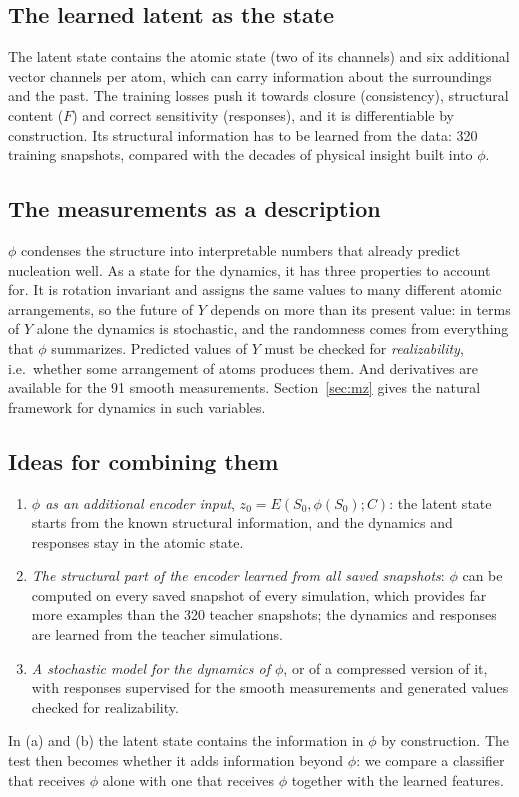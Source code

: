 \documentclass[11pt,a4paper]{article}
\numberwithin{equation}{section}
\begin{document}
\subsection{The learned latent as the state}

The latent state contains the atomic state (two of its channels) and six additional
vector channels per atom, which can carry information about the surroundings and
the past. The training losses push it towards closure (consistency), structural
content ($F$) and correct sensitivity (responses), and it is differentiable by
construction. Its structural information has to be learned from the data: 320
training snapshots, compared with the decades of physical insight built into $\phi$.

\subsection{The measurements as a description}

$\phi$ condenses the structure into interpretable numbers that already predict
nucleation well. As a state for the dynamics, it has three properties to account
for. It is rotation invariant and assigns the same values to many different atomic
arrangements, so the future of $Y$ depends on more than its present value: in terms
of $Y$ alone the dynamics is stochastic, and the randomness comes from everything
that $\phi$ summarizes. Predicted values of $Y$ must be checked for
\emph{realizability}, i.e.\ whether some arrangement of atoms produces them. And
derivatives are available for the 91 smooth measurements. Section~\ref{sec:mz}
gives the natural framework for dynamics in such variables.

\subsection{Ideas for combining them}
\label{sec:ideas}

\begin{enumerate}[label=(\alph*),leftmargin=2em]
\item \emph{$\phi$ as an additional encoder input}, $z_0=E(S_0,\phi(S_0);C)$: the latent state
  starts from the known structural information, and the dynamics and responses stay in the
  atomic state.
\item \emph{The structural part of the encoder learned from all saved snapshots}: $\phi$ can be
  computed on every saved snapshot of every simulation, which provides far more examples than
  the 320 teacher snapshots; the dynamics and responses are learned from the teacher
  simulations.
\item \emph{A stochastic model for the dynamics of $\phi$}, or of a compressed version of it, with
  responses supervised for the smooth measurements and generated values checked for
  realizability.
\end{enumerate}
In (a) and (b) the latent state contains the information in $\phi$ by
construction. The test then becomes whether it adds information beyond $\phi$: we
compare a classifier that receives $\phi$ alone with one that receives $\phi$
together with the learned features.
\end{document}
